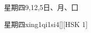 \begin{entry}{星期四}{9,12,5}{⽇、⽉、⼞}
  \begin{phonetics}{星期四}{xing1qi1si4}[][HSK 1]
  \end{phonetics}
\end{entry}
